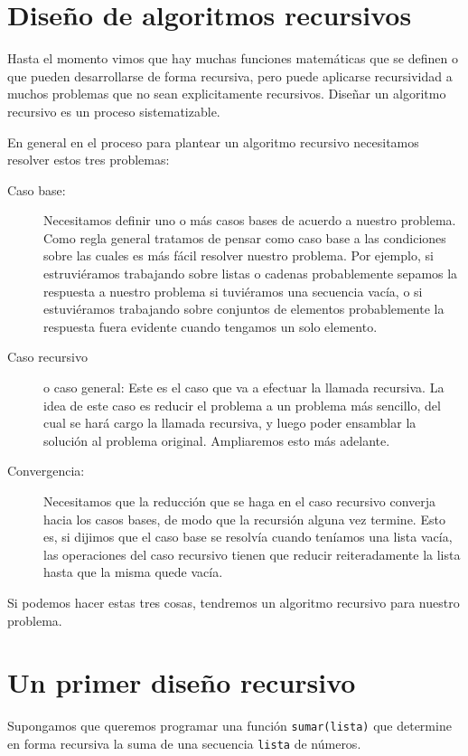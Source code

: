 \section{Diseño de algoritmos recursivos}

Hasta el momento vimos que hay muchas funciones matemáticas que se definen
o que pueden desarrollarse de forma recursiva, pero puede aplicarse recursividad
a muchos problemas que no sean explicitamente recursivos. Diseñar un
algoritmo recursivo es un proceso sistematizable.

En general en el proceso para plantear un algoritmo recursivo necesitamos
resolver estos tres problemas:

\begin{description}
\item[Caso base:] Necesitamos definir uno o más casos bases de acuerdo a
nuestro problema. Como regla general tratamos de pensar como caso base a
las condiciones sobre las cuales es más fácil resolver nuestro problema.
Por ejemplo, si estruviéramos trabajando sobre listas o cadenas probablemente
sepamos la respuesta a nuestro problema si tuviéramos una secuencia vacía,
o si estuviéramos trabajando sobre conjuntos de elementos probablemente la
respuesta fuera evidente cuando tengamos un solo elemento.
\item[Caso recursivo] o caso general: Este es el caso que va a efectuar
la llamada recursiva. La idea de este caso es reducir el problema a un
problema más sencillo, del cual se hará cargo la llamada recursiva, y luego
poder ensamblar la solución al problema original. Ampliaremos esto más adelante.
\item[Convergencia:] Necesitamos que la reducción que se haga en el caso
recursivo converja hacia los casos bases, de modo que la recursión alguna
vez termine. Esto es, si dijimos que el caso base se resolvía cuando teníamos
una lista vacía, las operaciones del caso recursivo tienen que reducir
reiteradamente la lista hasta que la misma quede vacía.
\end{description}

Si podemos hacer estas tres cosas, tendremos un algoritmo recursivo para
nuestro problema.

\section{Un primer diseño recursivo}

Supongamos que queremos programar una función \lstinline!sumar(lista)! que
determine en forma recursiva la suma de una secuencia \lstinline!lista! de
números.

